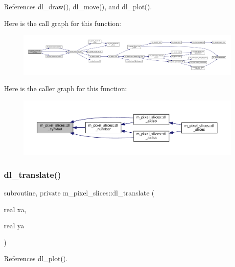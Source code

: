 References dl\+\_\+draw(), dl\+\_\+move(), and dl\+\_\+plot().

Here is the call graph for this function\+:\nopagebreak
\begin{figure}[H]
\begin{center}
\leavevmode
\includegraphics[width=350pt]{namespacem__pixel__slices_a2a40fc08575b18772b520c7b5b81a91e_cgraph}
\end{center}
\end{figure}
Here is the caller graph for this function\+:\nopagebreak
\begin{figure}[H]
\begin{center}
\leavevmode
\includegraphics[width=350pt]{namespacem__pixel__slices_a2a40fc08575b18772b520c7b5b81a91e_icgraph}
\end{center}
\end{figure}
\mbox{\label{namespacem__pixel__slices_ad35fa14bd29e8e895f22de6500b6b5ff}} 
\subsubsection{\texorpdfstring{dl\+\_\+translate()}{dl\_translate()}}
{\footnotesize\ttfamily subroutine, private m\+\_\+pixel\+\_\+slices\+::dl\+\_\+translate (\begin{DoxyParamCaption}\item[{real}]{xa,  }\item[{real}]{ya }\end{DoxyParamCaption})\hspace{0.3cm}{\ttfamily [private]}}



References dl\+\_\+plot().

